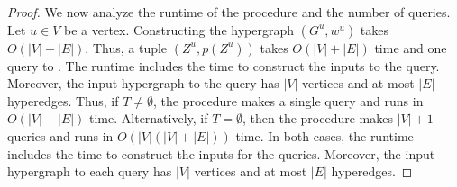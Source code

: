 \begin{proof}
We now analyze the runtime of the procedure and the number of  queries. Let $u \in V$ be a vertex. Constructing the hypergraph $(G^{u}, w^{u})$ takes $O(|V| + |E|)$. Thus, a tuple $(Z^{u}, p(Z^u))$ takes $O(|V|+|E|)$ time and one query to . The runtime includes the time to construct the inputs to the query. Moreover, the input hypergraph to the query has $|V|$ vertices and at most $|E|$ hyperedges. Thus, if $T \not = \emptyset$, the procedure makes a single  query and runs in $O(|V| + |E|)$ time. Alternatively, if  $T  = \emptyset$, then the procedure makes $|V| + 1$  queries and runs in $O(|V|(|V| + |E|))$ time. In both cases, the runtime includes the time to construct the inputs for the  queries. Moreover, the input hypergraph to each query has $|V|$ vertices and at most $|E|$ hyperedges.
\end{proof}

